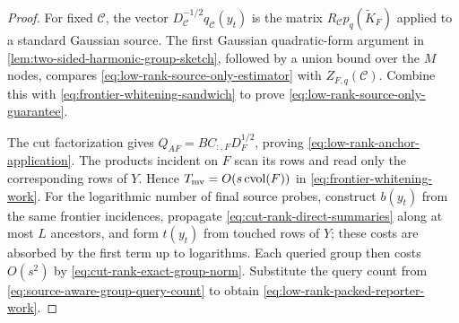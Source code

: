 \begin{proof}
For fixed $\mathcal C$, the vector
$D_{\mathcal C}^{-1/2}q_{\mathcal C}(y_t)$ is the matrix
$R_{\mathcal C}p_q(\widetilde K_F)$ applied to a standard Gaussian source.
The first Gaussian quadratic-form argument in
\cref{lem:two-sided-harmonic-group-sketch}, followed by a union bound over
the $M$ nodes, compares
\cref{eq:low-rank-source-only-estimator} with
$Z_{F,q}(\mathcal C)$.  Combine this with
\cref{eq:frontier-whitening-sandwich} to prove
\cref{eq:low-rank-source-only-guarantee}.

The cut factorization gives
$Q_{AF}=BC_{:,F}D_F^{1/2}$, proving
\cref{eq:low-rank-anchor-application}.  The products incident on $F$ scan
its rows and read only the corresponding rows of $Y$.  Hence
$T_{\rm mv}=O(s\operatorname{cvol}(F))$ in
\cref{eq:frontier-whitening-work}.  For the logarithmic number of final
source probes, construct $b(y_t)$ from the same frontier incidences, propagate
\cref{eq:cut-rank-direct-summaries} along at most $L$ ancestors, and form
$t(y_t)$ from touched rows of $Y$; these costs are absorbed by the first term
up to logarithms.  Each queried group then costs $O(s^2)$ by
\cref{eq:cut-rank-exact-group-norm}.  Substitute the query count from
\cref{eq:source-aware-group-query-count} to obtain
\cref{eq:low-rank-packed-reporter-work}.
\end{proof}

